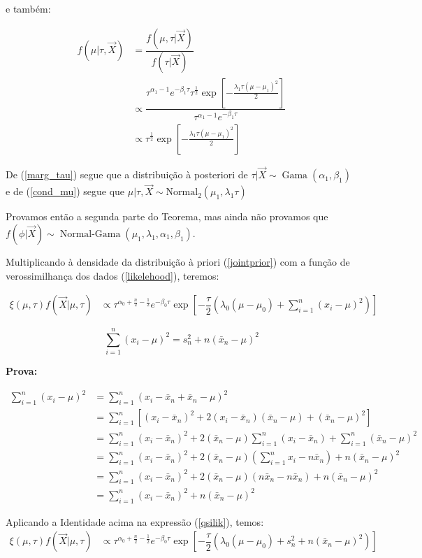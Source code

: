\documentclass[a4paper]{article}
\newcommand{\op}[1]{{\operatorname{#1}}}
\newcommand{\vX}{\vec X}
\newcommand{\xn}{\bar{x}_n}
\newcommand{\sn}{s^2_n}
\begin{document}
e também:

\begin{align}
f(\mu|\tau,\vX)&=\dfrac{f(\mu,\tau|\vX)}{f(\tau|\vX)}\nonumber\\
&\propto\dfrac{\tau^{\alpha_1-1}e^{-\beta_1\tau}\tau^{\frac12}\exp{\left[-\frac{\lambda_1\tau (\mu-\mu_1)^2}2\right]}}{\tau^{\alpha_1-1}e^{-\beta_1\tau}}\nonumber\\
&\propto \tau^{\frac12}\exp{\left[-\frac{\lambda_1\tau (\mu-\mu_1)^2}2\right]}\label{cond_mu}
\end{align}

De (\ref{marg_tau}) segue que a distribuição à posteriori de $\tau|\vX\sim \op{Gama}(\alpha_1,\beta_1)$ e de (\ref{cond_mu}) segue que $\mu|\tau,\vX\sim\op{Normal_2}(\mu_1,\lambda_1\tau)$

Provamos então a segunda parte do Teorema, mas ainda não provamos que $f(\phi|\vX)\sim\op{Normal-Gama}(\mu_1,\lambda_1,\alpha_1,\beta_1)$.

Multiplicando à densidade da distribuição à priori (\ref{jointprior}) com a função de verossimilhança dos dados (\ref{likelehood}), teremos:

\begin{align}
\xi(\mu,\tau)f(\vX|\mu,\tau)&\propto \tau^{\alpha_0+\frac n 2-\frac12}e^{-\beta_0\tau}\exp{\left[-\dfrac{\tau}{2}\left(\lambda_0(\mu-\mu_0)+\sum_{i=1}^{n}(x_i-\mu)^2\right)\right]}\label{qsilik}
\end{align}

\begin{identity}
	\[\sum_{i=1}^{n}(x_i-\mu)^2=\sn+n(\xn-\mu)^2\]
\end{identity}
\textbf{Prova:}

\begin{align*}
	\sum_{i=1}^{n}(x_i-\mu)^2&=\sum_{i=1}^{n}(x_i-\xn+\xn-\mu)^2\\
	&=\sum_{i=1}^{n}\left[(x_i-\xn)^2+2(x_i-\xn)(\xn-\mu)+(\xn-\mu)^2\right]\\
	&=\sum_{i=1}^{n}(x_i-\xn)^2+2(\xn-\mu)\sum_{i=1}^{n}(x_i-\xn)+\sum_{i=1}^{n}(\xn-\mu)^2\\
	&=\sum_{i=1}^{n}(x_i-\xn)^2+2(\xn-\mu)\left(\sum_{i=1}^{n}x_i-n\xn\right)+n(\xn-\mu)^2\\
	&=\sum_{i=1}^{n}(x_i-\xn)^2+2(\xn-\mu)\left(n\xn-n\xn\right)+n(\xn-\mu)^2\\
	&=\sum_{i=1}^{n}(x_i-\xn)^2+n(\xn-\mu)^2
\end{align*}

Aplicando a Identidade acima na expressão (\ref{qsilik}), temos:
\begin{align*}
\xi(\mu,\tau)f(\vX|\mu,\tau)&\propto \tau^{\alpha_0+\frac n 2-\frac12}e^{-\beta_0\tau}\exp{\left[-\dfrac{\tau}{2}\left(\lambda_0(\mu-\mu_0)+\sn+n(\xn-\mu)^2\right)\right]}
\end{align*}
\end{document}
